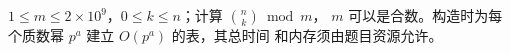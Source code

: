 $1\le m\le 2\times 10^9$，$0\le k\le n$；计算 $\binom nk\bmod m$，
$m$ 可以是合数。构造时为每个质数幂 $p^a$ 建立 $O(p^a)$ 的表，其总时间
和内存须由题目资源允许。
